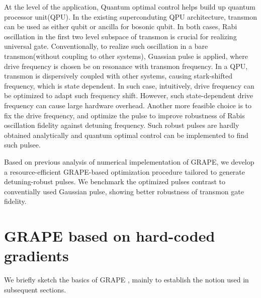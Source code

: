 \documentclass[12pt]{article}
\begin{document}
At the level of the application, Quantum optimal control helps build up quantum processor unit(QPU). In the existing superconduting QPU architecture, transmon can be used as either qubit or ancilla for bosonic qubit. In both cases, Rabi oscillation in the first two level subspace of transmon is crucial for realizing universal gate. Conventionally, to realize such oscillation in a bare transmon(without coupling to other systems), Guassian pulse is applied, where drive frequency is chosen be on resonance with transmon frequency. In a QPU, transmon is dispersively coupled with other systems, causing stark-shifted frequency, which is state dependent. In such case, intuitively, drive frequency can be optimized to adapt such frequency shift. However, such state-dependent drive frequency can cause large hardware overhead. Another more feasible choice is to fix the drive frequency, and optimize the pulse to improve robustness of Rabis oscillation fidelity against detuning frequency. Such robust pulses are hardly obtained analytically and quantum optimal control can be implemented to find such pulsee.

Based on previous analysis of numerical impelementation of GRAPE, we develop a resource-efficient GRAPE-based optimization procedure tailored to generate detuning-robust pulses. We benchmark the optimized pulses contrast to conventially used Gaussian pulse, showing better robustness of transmon gate fidelity.



\newpage
\section{GRAPE based on hard-coded gradients}
We briefly sketch the basics of GRAPE \cite{nmrkhaneja2005optimal}, mainly to establish the notion used in subsequent sections. 
\end{document}
